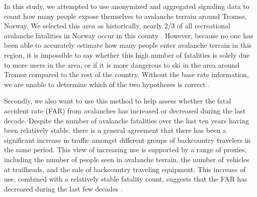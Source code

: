 \documentclass[authordate,empirical, issue]{jote-new-article}
\begin{document}
In this study, we attempted to use anonymized and aggregated signaling data to count how many people expose themselves to avalanche terrain around Tromsø, Norway. We selected this area as historically, nearly 2/3 of all recreational avalanche fatalities in Norway occur in this county \parencites{Varsom2021}. However, because no one has been able to accurately estimate how many people enter avalanche terrain in this region, it is impossible to say whether this high number of fatalities is solely due to more users in the area, or if it is more dangerous to ski in the area around Tromsø compared to the rest of the country. Without the base rate information, we are unable to determine which of the two hypotheses is correct \parencites{Johnson2020}{Kahneman1973}.







Secondly, we also want to use this method to help assess whether the fatal accident rate (FAR) from avalanches has increased or decreased during the last decade. Despite the number of avalanche fatalities over the last ten years having been relatively stable, there is a general agreement that there has been a significant increase in traffic amongst different groups of backcountry travelers in the same period. This view of increasing use is supported by a range of proxies, including the number of people seen in avalanche terrain, the number of vehicles at trailheads, and the sale of backcountry traveling equipment. This increase of use, combined with a relatively stable fatality count, suggests that the FAR has decreased during the last few decades \parencites{Techel2016}.
\end{document}

